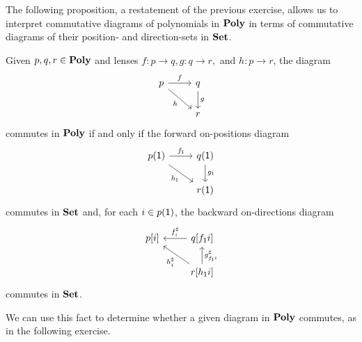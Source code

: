 \documentclass[Book-Poly]{subfiles}
\begin{document}

The following proposition, a restatement of the previous exercise, allows us to interpret commutative diagrams of polynomials in $\mathbf{Poly}$ in terms of commutative diagrams of their position- and direction-sets in $\mathbf{Set}$.

\begin{proposition} \label{prop.comm_poly}
Given $p,q,r\in\mathbf{Poly}$ and lenses $f\colon p\to q, g\colon q\to r,$ and $h\colon p\to r$, the diagram
\[
\begin{tikzcd}
    p \ar[r, "f"] \ar[dr, "h"'] & q \ar[d, "g"] \\
    & r
\end{tikzcd}
\]
commutes in $\mathbf{Poly}$ if and only if the forward on-positions diagram
\[
\begin{tikzcd}
    p(\1) \ar[r, "f_\1"] \ar[dr, "h_\1"'] & q(\1) \ar[d, "g_\1"] \\
    & r(\1)
\end{tikzcd}
\]
commutes in $\mathbf{Set}$ and, for each $i \in p(\textsf{1})$, the backward on-directions diagram
\[
\begin{tikzcd}
    p[i] & q[f_\1i] \ar[l, "f^\sharp_i"'] \\
    & r[h_\1i] \ar[u, "g^\sharp_{f_\1i}"'] \ar[ul, "h^\sharp_i"]
\end{tikzcd}
\]
commutes in $\mathbf{Set}$.
\end{proposition}

We can use this fact to determine whether a given diagram in $\mathbf{Poly}$ commutes, as in the following exercise.
\end{document}
